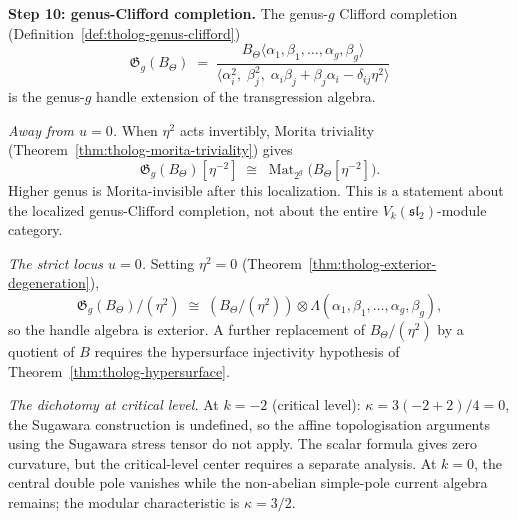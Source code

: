 \begin{construction}
\medskip
\noindent\textbf{Step 10: genus-Clifford completion.}
The genus-$g$ Clifford completion
(Definition~\ref{def:tholog-genus-clifford})
\[
\mathfrak G_g(B_\Theta)
\;=\;
\frac{B_\Theta\langle\alpha_1,\beta_1,\dots,\alpha_g,\beta_g\rangle}
{\langle\alpha_i^2,\;\beta_j^2,\;
\alpha_i\beta_j+\beta_j\alpha_i-\delta_{ij}\eta^2\rangle}
\]
is the genus-\(g\) handle extension of the transgression algebra.

\emph{Away from $u=0$.}
When $\eta^2$ acts invertibly, Morita triviality
(Theorem~\ref{thm:tholog-morita-triviality}) gives
\[
\mathfrak G_g(B_\Theta)[\eta^{-2}]
\;\cong\;
\operatorname{Mat}_{2^g}\bigl(B_\Theta[\eta^{-2}]\bigr).
\]
Higher genus is Morita-invisible after this localization. This is a
statement about the localized genus-Clifford completion, not about the
entire \(V_k(\mathfrak{sl}_2)\)-module category.

\emph{The strict locus $u=0$.}
Setting $\eta^2=0$ (Theorem~\ref{thm:tholog-exterior-degeneration}),
\[
\mathfrak G_g(B_\Theta)/(\eta^2)
\;\cong\;
(B_\Theta/(\eta^2))
\otimes
\Lambda(\alpha_1,\beta_1,\dots,\alpha_g,\beta_g),
\]
so the handle algebra is exterior.  A further replacement of
\(B_\Theta/(\eta^2)\) by a quotient of \(B\) requires the
hypersurface injectivity hypothesis of
Theorem~\ref{thm:tholog-hypersurface}.

\emph{The dichotomy at critical level.}
At $k=-2$ (critical level): $\kappa = 3(-2+2)/4 = 0$, the
Sugawara construction is undefined, so the affine topologisation
arguments using the Sugawara stress tensor do not apply.  The scalar
formula gives zero curvature, but the critical-level center requires a
separate analysis. At \(k=0\), the central double pole vanishes while
the non-abelian simple-pole current algebra remains; the modular
characteristic is \(\kappa=3/2\).


\end{construction}
